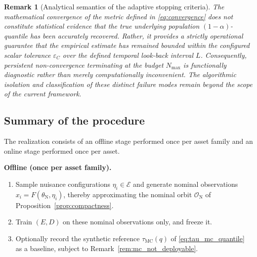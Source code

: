 \documentclass[a4paper]{cas-sc}
\newtheorem{remark}{Remark}
\newcommand{\EtaSpace}{\ensuremath{\mathcal{E}}}
\newcommand{\taumc}{\ensuremath{\tau_{\mathrm{MC}}}}
\begin{document}
\begin{remark}[Analytical semantics of the adaptive stopping criteria]
\label{rem:stopping_semantics}
The mathematical convergence of the metric defined in \eqref{eq:convergence} does not constitute statistical evidence that the true underlying population \((1-\alpha)\)-quantile has been accurately recovered. Rather, it provides a strictly operational guarantee that the empirical estimate has remained bounded within the configured scalar tolerance \(\varepsilon_C\) over the defined temporal look-back interval \(L\). Consequently, persistent non-convergence terminating at the budget \(N_{\max}\) is functionally diagnostic rather than merely computationally inconvenient.  The algorithmic isolation and classification of these distinct failure modes remain beyond the scope of the current framework.
\end{remark}

\subsection{Summary of the procedure}
\label{subsec:procedure_summary}

The realization consists of an offline stage performed once per asset
family and an online stage performed once per asset.

\noindent\textbf{Offline (once per asset family).}
\begin{enumerate}[leftmargin=1.8em]
\item Sample nuisance configurations \(\eta_i\in\EtaSpace\) and generate
      nominal observations \(x_i=F(\theta_{\mathrm{N}},\eta_i)\), thereby
      approximating the nominal orbit \(\mathcal{O}_{\mathrm N}\) of
      Proposition~\ref{prop:compactness}.
\item Train \((E,D)\) on these nominal observations only, and freeze it.
\item Optionally record the synthetic reference \(\taumc(q)\) of
      \eqref{eq:tau_mc_quantile} as a baseline, subject to
      Remark~\ref{rem:mc_not_deployable}.
\end{enumerate}
\end{document}
